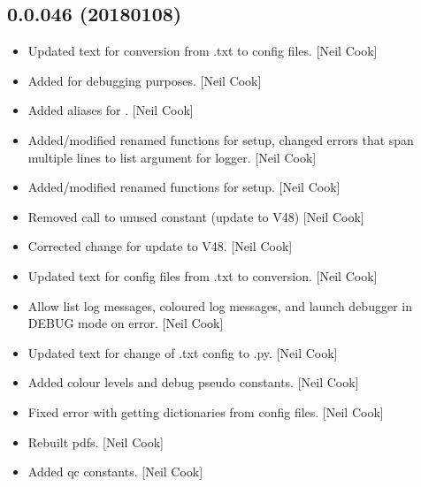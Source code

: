 \documentclass[a4paper,10pt,english]{report}
\begin{document}
\subsection{0.0.046 (2018\sphinxhyphen{}01\sphinxhyphen{}08)}
\label{\detokenize{misc/changelog:id524}}\begin{itemize}
\item {} 
Updated text for conversion from .txt to  config files. {[}Neil Cook{]}

\item {} 
Added  for debugging purposes. {[}Neil Cook{]}

\item {} 
Added aliases for . {[}Neil Cook{]}

\item {} 
Added/modified renamed functions for setup, changed errors that span
multiple lines to list argument for logger. {[}Neil Cook{]}

\item {} 
Added/modified renamed functions for setup. {[}Neil Cook{]}

\item {} 
Removed call to unused constant (update to V48) {[}Neil Cook{]}

\item {} 
Corrected change for update to V48. {[}Neil Cook{]}

\item {} 
Updated text for config files from .txt to  conversion. {[}Neil Cook{]}

\item {} 
Allow list log messages, coloured log messages, and launch debugger in
DEBUG mode on error. {[}Neil Cook{]}

\item {} 
Updated text for change of .txt config to .py. {[}Neil Cook{]}

\item {} 
Added colour levels and debug pseudo constants. {[}Neil Cook{]}

\item {} 
Fixed error with getting dictionaries from config files. {[}Neil Cook{]}

\item {} 
Rebuilt pdfs. {[}Neil Cook{]}

\item {} 
Added qc constants. {[}Neil Cook{]}


\end{itemize}
\end{document}
